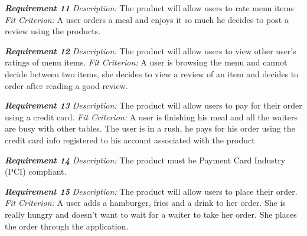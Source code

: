 \documentclass[12pt, titlepage]{article}
\begin{document}
\noindent\textbf{\textit{Requirement 11}}\newline
\textit{Description:}\newline
The product will allow users to rate menu items \newline\newline
\textit{Fit Criterion:}\newline 
A user orders a meal and enjoys it so much he decides to post a review using the products.
\newline

\noindent\textbf{\textit{Requirement 12}}\newline
\textit{Description:}\newline
The product will allow users to view other user's ratings of menu items. \newline\newline
\textit{Fit Criterion:}\newline 
A user is browsing the menu and cannot decide between two items, she decides to view a review of an item and decides to order after reading a good review.
\newline

\noindent\textbf{\textit{Requirement 13}}\newline
\textit{Description:}\newline
The product will allow users to pay for their order using a credit card. \newline\newline
\textit{Fit Criterion:}\newline 
A user is finishing his meal and all the waiters are busy with other tables. The user is in a rush, he pays for his order using the credit card info registered to his account associated with the product
\newline

\noindent\textbf{\textit{Requirement 14}}\newline
\textit{Description:}\newline
The product must be Payment Card Industry (PCI) compliant.
\newline

\noindent\textbf{\textit{Requirement 15}}\newline
\textit{Description:}\newline
The product will allow users to place their order. \newline\newline
\textit{Fit Criterion:}\newline 
A user adds a hamburger, fries and a drink to her order. She is really hungry and doesn't want to wait for a waiter to take her order. She places the order through the application.
\newline
\end{document}
